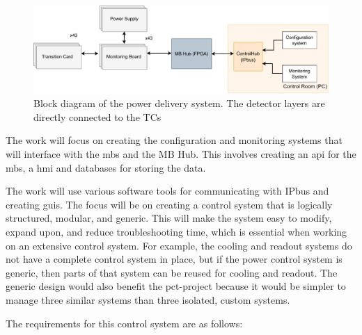 \documentclass[main.tex]{subfiles}
\begin{document}
\begin{figure}[!htpb]
    \centering
    \includegraphics[scale = 0.65]{images/PCS basic overview.pdf}
    \caption{Block diagram of the power delivery system. The detector layers are directly connected to the TCs}
    \label{fig: pcs_basic}
\end{figure}
\FloatBarrier

The work will focus on creating the configuration and monitoring systems that will interface with the \gls{mb}s and the MB Hub. This involves creating an \gls{api} for the \gls{mb}s, a \gls{hmi} and databases for storing the data.

The work will use various software tools for communicating with IPbus and creating \gls{gui}s. The focus will be on creating a control system that is logically structured, modular, and generic. This will make the system easy to modify, expand upon, and reduce troubleshooting time, which is essential when working on an extensive control system. For example, the cooling and readout systems do not have a complete control system in place, but if the power control system is generic, then parts of that system can be reused for cooling and readout. The generic design would also benefit the \gls{pct}-project because it would be simpler to manage three similar systems than three isolated, custom systems.


The requirements for this control system are as follows:
\end{document}
